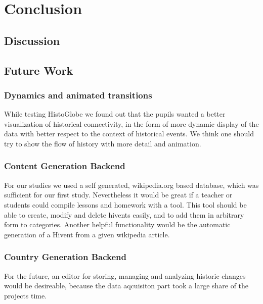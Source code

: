 \section{Conclusion} %
\label{sec:conclusion}

\subsection{Discussion} %
\label{sub:discussion}


\subsection{Future Work} %
\label{sub:future_work}

\subsubsection{Dynamics and animated transitions} %
\label{sub:dynamics_and_animated_transitions}
While testing HistoGlobe we found out that the pupils wanted a better visualization of historical connectivity, in the form of  more dynamic display of the data with better respect to the context of historical events. We think one should try to show the flow of history with more detail and animation.



\subsubsection{Content Generation Backend} %
\label{sub:content_generation_backend}

For our studies we used a self generated, wikipedia.org based database, which was sufficient for our first study. Nevertheless it would be great if a teacher or students could compile lessons and homework with a tool. This tool should be able to create, modify and delete hivents easily, and to add them in arbitrary form to categories.
Another helpful functionality would be the automatic generation of a Hivent from a given wikipedia article.


\subsubsection{Country Generation Backend} %
\label{sub:country_generation_backend}
For the future, an editor for storing, managing and analyzing historic changes would be desireable, because the data aqcuisiton part took a large share of the projects time.


